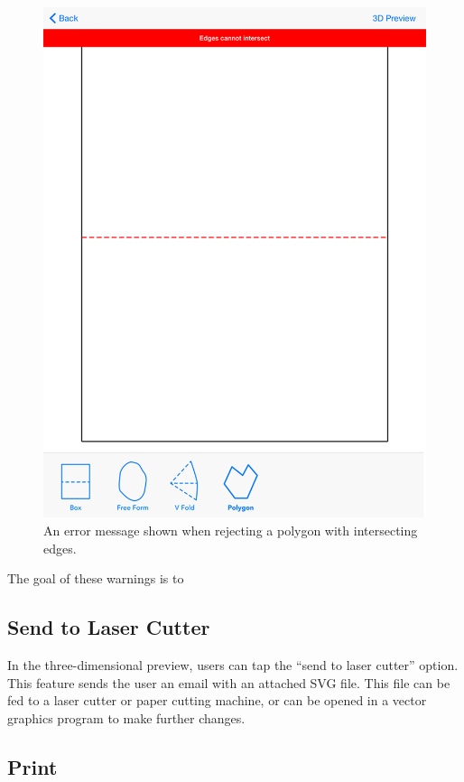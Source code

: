 \begin{figure}[htbp]
\centering
\includegraphics{figures/32_UI_Tool_Interactions/error_message.png}
\caption{An error message shown when rejecting a polygon with
intersecting edges.}
\end{figure}

The goal of these warnings is to

\subsection{Send to Laser Cutter}\label{send-to-laser-cutter}

In the three-dimensional preview, users can tap the ``send to laser
cutter'' option. This feature sends the user an email with an attached
SVG file. This file can be fed to a laser cutter or paper cutting
machine, or can be opened in a vector graphics program to make further
changes.

\subsection{Print}\label{print}

